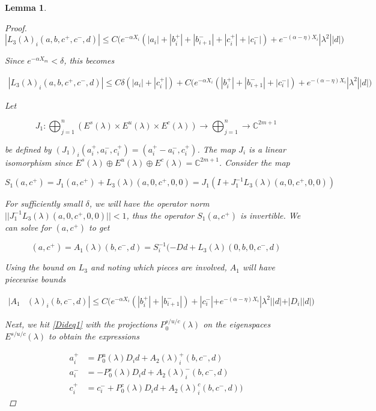\documentclass[12pt]{article}
\def\C{{\mathbb C}}
\newtheorem{lemma}{Lemma}
\begin{document}
\begin{lemma}
\begin{proof}
\begin{equation}\label{L3bound}
|L_3(\lambda)_i(a, b, c^+, c^-, d)| \leq C \Big( e^{-\alpha X_i} ( |a_i| + |b_i^+| + |b_{i+1}^-| + |c_i^+| + |c_i^-|) + e^{-(\alpha - \eta) X_i} |\lambda^2| |d| \Big)
\end{equation}

Since $e^{-\alpha X_m} < \delta$, this becomes

\begin{align*}
|L_3(\lambda)_i(a, b, c^+, c^-, d)| \leq C \delta ( |a_i| + |c_i^+| ) + C\Big( e^{-\alpha X_i} ( |b_i^+| + |b_{i+1}^-| + |c_i^-|) + e^{-(\alpha - \eta) X_i} |\lambda^2| |d| \Big)
\end{align*}

Let 

\[
J_1: \bigoplus_{j=1}^n (E^s(\lambda) \times E^u(
\lambda) \times E^c(\lambda) ) \rightarrow \bigoplus_{j=1}^n \rightarrow \C^{2m+1}
\]

be defined by $(J_1)_i(a_i^+, a_i^-, c_i^+) = (a_i^+ - a_i^-, c_i^+)$. The map $J_i$ is a linear isomorphism since $E^s(\lambda) \oplus E^u(\lambda) \oplus E^c(\lambda) = \C^{2m + 1}$. Consider the map

\[
S_1(a, c^+) = J_1 (a, c^+) + L_3(\lambda)(a, 0, c^+, 0, 0) = J_1( I + J_1^{-1} L_3(\lambda)(a, 0, c^+, 0, 0))
\]

For sufficiently small $\delta$, we will have the operator norm $||J_1^{-1} L_3(\lambda)(a, 0, c^+, 0, 0)|| < 1$, thus the operator $S_1(a, c^+)$ is invertible. We can solve for $(a, c^+)$ to get

\[
(a, c^+) = A_1(\lambda)(b, c^-, d) = S_i^{-1}(-D d + L_3(\lambda)(0, b, 0, c^-, d)
\]

Using the bound on $L_3$ and noting which pieces are involved, $A_1$ will have piecewise bounds

\begin{align*}
|A_1&(\lambda)_i(b, c^-, d)|
\leq C \Big( e^{-\alpha X_i} (|b_i^+| + |b_{i+1}^-|) + |c_i^-| + e^{-(\alpha - \eta) X_i} |\lambda^2||d| + |D_i||d| \Big)
\end{align*} 

Next, we hit \eqref{Dideq1} with the projections $P_0^{s/u/c}(\lambda)$ on the eigenspaces $E^{s/u/c}(\lambda)$ to obtain the expressions

\begin{align*}
a_i^+ &= P_0^u(\lambda) D_i d + A_2(\lambda)_i^+(b, c^-, d) \\
a_i^- &= -P_0^s(\lambda) D_i d + A_2(\lambda)_i^-(b, c^-, d) \\
c_i^+ &= c_i^- + P_0^c(\lambda) D_i d + A_2(\lambda)_i^c(b, c^-, d) )
\end{align*}


\end{proof}
\end{lemma}
\end{document}
